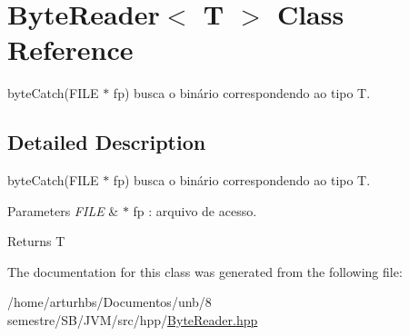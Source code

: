 \hypertarget{classByteReader_3_01T_01_4}{}\section{Byte\+Reader$<$ T $>$ Class Reference}
\label{classByteReader_3_01T_01_4}


byte\+Catch(\+F\+I\+L\+E $\ast$ fp) busca o binário correspondendo ao tipo T.  




\subsection{Detailed Description}
byte\+Catch(\+F\+I\+L\+E $\ast$ fp) busca o binário correspondendo ao tipo T. 


\begin{DoxyParams}{Parameters}
{\em F\+I\+LE} & $\ast$ fp \+: arquivo de acesso. \\
\hline
\end{DoxyParams}
\begin{DoxyReturn}{Returns}
T 
\end{DoxyReturn}


The documentation for this class was generated from the following file\+:\begin{DoxyCompactItemize}
\item 
/home/arturhbs/\+Documentos/unb/8 semestre/\+S\+B/\+J\+V\+M/src/hpp/\hyperlink{ByteReader_8hpp}{Byte\+Reader.\+hpp}\end{DoxyCompactItemize}
